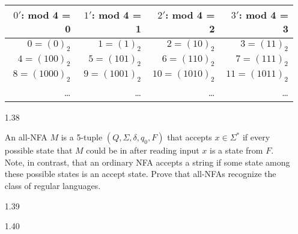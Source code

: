 \begin{enumerate}
          \begin{table}[H]
              \centering
              \begin{tabular}{|r|r|r|r|}
                  \hline
                  $0'$: mod 4 = 0      & $1'$: mod  4 = 1     & $2'$: mod 4 = 2       & $3'$: mod 4 = 3       \\
                  \hline
                  $0 = (0)_2$    & $1 = (1)_2$    & $2 = (10)_2$    & $3 = (11)_2$    \\
                  $4 = (100)_2$  & $5 = (101)_2$  & $6 = (110)_2$   & $7 = (111)_2$   \\
                  $8 = (1000)_2$ & $9 = (1001)_2$ & $10 = (1010)_2$ & $11 = (1011)_2$ \\
                  \ldots         & \ldots         & \ldots          & \ldots          \\
                  \hline
              \end{tabular}
          \end{table}

    \item [1.38]

    An all-NFA $M$ is a 5-tuple $(Q,\Sigma,\delta,q_0,F)$ that accepts $x \in \Sigma^\ast$ if every possible state that $M$ could be in after reading input $x$ is a state from $F$. Note, in contrast, that an ordinary NFA accepts a string if some state among these possible states is an accept state. Prove that all-NFAs recognize the class of regular languages.
    \item [1.39]
    \item [1.40]
\end{enumerate}
